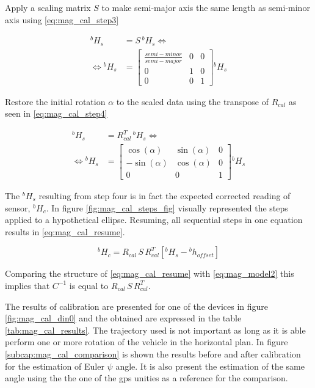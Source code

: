  Apply a scaling matrix $S$ to make semi-major axis the same length as semi-minor axis using \eqref{eq:mag_cal_step3}

\begin{equation}
\begin{aligned}
{}^bH_{s}&=S\,{}^bH_{s}\Leftrightarrow\\
\Leftrightarrow{}^bH_{s}&=\begin{bmatrix}
\frac{semi-minor}{semi-major} & 0 & 0\\
0 & 1 & 0\\
0 & 0 & 1
\end{bmatrix}{}^bH_{s}
\end{aligned}
\label{eq:mag_cal_step3}
\end{equation}

 Restore the initial rotation $\alpha$ to the scaled data using the transpose of $R_{cal}$ as seen in \eqref{eq:mag_cal_step4}

\begin{equation}
\begin{aligned}
{}^bH_{s}&=R^T_{cal}\,{}^bH_{s}\Leftrightarrow\\
\Leftrightarrow{}^bH_{s}&=\begin{bmatrix}
\cos(\alpha) & \sin(\alpha) & 0\\
-\sin(\alpha) & \cos(\alpha)  & 0\\
0			 & 0			 & 1
\end{bmatrix}{}^bH_{s}
\end{aligned}
\label{eq:mag_cal_step4}
\end{equation}

The ${}^bH_{s}$ resulting from step four is in fact the expected
corrected reading of sensor, ${}^bH_{c}$. In figure
\ref{fig:mag_cal_steps_fig} visually represented the steps applied to a
hypothetical ellipse. Resuming, all sequential steps in one equation results in
\eqref{eq:mag_cal_resume}.

\begin{equation}
{}^bH_{c}=R_{cal}\,S\,R^T_{cal}[{}^bH_{s}-{}^bh_{offset}]
\label{eq:mag_cal_resume}
\end{equation}

Comparing the structure of \eqref{eq:mag_cal_resume} with \eqref{eq:mag_model2} this implies that $C^{-1}$ is equal to $R_{cal}\,S\,R^T_{cal}$. 

The results of calibration are presented for one of the devices in figure
\ref{fig:mag_cal_din0} and the obtained are expressed in the table
\ref{tab:mag_cal_results}. The trajectory used is not important as long as it is
able perform one or more rotation of the vehicle in the horizontal plan. In
figure \ref{subcap:mag_cal_comparison} is shown the results before and after
calibration for the estimation of Euler $\psi$ angle. It is also present the
estimation of the same angle using the the one of the gps unities as a reference
for the comparison.

